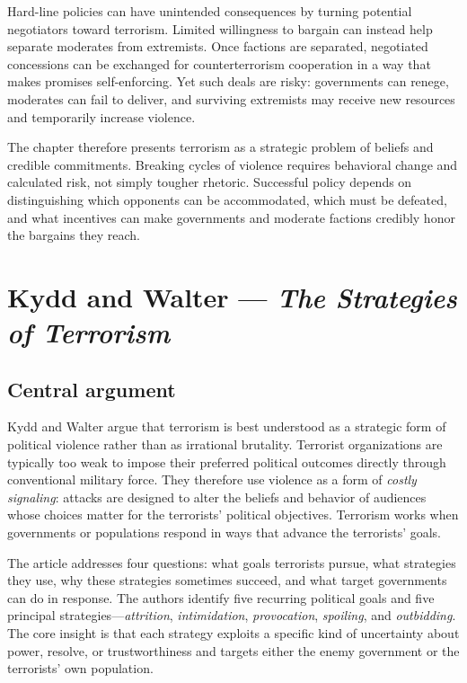 Hard-line policies can have unintended consequences by turning potential negotiators toward terrorism. Limited willingness to bargain can instead help separate moderates from extremists. Once factions are separated, negotiated concessions can be exchanged for counterterrorism cooperation in a way that makes promises self-enforcing. Yet such deals are risky: governments can renege, moderates can fail to deliver, and surviving extremists may receive new resources and temporarily increase violence.

The chapter therefore presents terrorism as a strategic problem of beliefs and credible commitments. Breaking cycles of violence requires behavioral change and calculated risk, not simply tougher rhetoric. Successful policy depends on distinguishing which opponents can be accommodated, which must be defeated, and what incentives can make governments and moderate factions credibly honor the bargains they reach.

\clearpage
\section{Kydd and Walter --- \textit{The Strategies of Terrorism}}

\subsection{Central argument}

Kydd and Walter argue that terrorism is best understood as a strategic form of political violence rather than as irrational brutality. Terrorist organizations are typically too weak to impose their preferred political outcomes directly through conventional military force. They therefore use violence as a form of \textit{costly signaling}: attacks are designed to alter the beliefs and behavior of audiences whose choices matter for the terrorists' political objectives. Terrorism works when governments or populations respond in ways that advance the terrorists' goals.

The article addresses four questions: what goals terrorists pursue, what strategies they use, why these strategies sometimes succeed, and what target governments can do in response. The authors identify five recurring political goals and five principal strategies---\textit{attrition}, \textit{intimidation}, \textit{provocation}, \textit{spoiling}, and \textit{outbidding}. The core insight is that each strategy exploits a specific kind of uncertainty about power, resolve, or trustworthiness and targets either the enemy government or the terrorists' own population.

